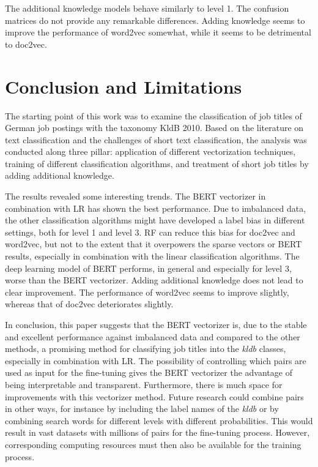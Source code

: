 \documentclass[12pt, a4paper, titlepage]{article}
\begin{document}
The additional knowledge models behave similarly to level 1. The confusion matrices do not provide any remarkable differences. Adding knowledge seems to improve the performance of word2vec somewhat, while it seems to be detrimental to doc2vec.


\section{Conclusion and Limitations}
The starting point of this work was to examine the classification of job titles of German job postings with the taxonomy \ac{KldB} 2010. Based on the literature on text classification and the challenges of short text classification, the analysis was conducted along three pillar: application of different vectorization techniques, training of different classification algorithms, and treatment of short job titles by adding additional knowledge. 

The results revealed some interesting trends. The \ac{BERT} vectorizer in combination with \ac{LR} has shown the best performance. Due to imbalanced data, the other classification algorithms might have developed a label bias in different settings, both for level 1 and level 3. \ac{RF} can reduce this bias for doc2vec and word2vec, but not to the extent that it overpowers the sparse vectors or \ac{BERT} results, especially in combination with the linear classification algorithms. The deep learning model of \ac{BERT} performs, in general and especially for level 3, worse than the \ac{BERT} vectorizer. Adding additional knowledge does not lead to clear improvement. The performance of word2vec seems to improve slightly, whereas that of doc2vec deteriorates slightly. 

In conclusion, this paper suggests that the \ac{BERT} vectorizer is, due to the stable and excellent performance against imbalanced data and compared to the other methods, a promising method for classifying job titles into the \textit{kldb} classes, especially in combination with \ac{LR}. The possibility of controlling which pairs are used as input for the fine-tuning gives the \ac{BERT} vectorizer the advantage of being interpretable and transparent. Furthermore, there is much space for improvements with this vectorizer method. Future research could combine pairs in other ways, for instance by including the label names of the \textit{kldb} or by combining search words for different levels with different probabilities. This would result in vast datasets with millions of pairs for the fine-tuning process. However, corresponding computing resources must then also be available for the training process. 
\end{document}
